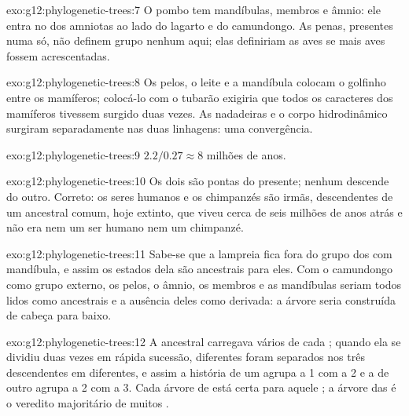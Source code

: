 \begin{solution}{exo:g12:phylogenetic-trees:7}
O pombo tem mandíbulas, membros e âmnio: ele entra no  dos
amniotas ao lado do lagarto e do camundongo. As penas, presentes numa
 só, não definem grupo nenhum aqui; elas definiriam as aves se
mais aves fossem acrescentadas.
\end{solution}

\begin{solution}{exo:g12:phylogenetic-trees:8}
Os pelos, o leite e a mandíbula colocam o golfinho entre os mamíferos;
colocá-lo com o tubarão exigiria que todos os caracteres dos mamíferos
tivessem surgido duas vezes. As nadadeiras e o corpo hidrodinâmico
surgiram separadamente nas duas linhagens: uma convergência.
\end{solution}

\begin{solution}{exo:g12:phylogenetic-trees:9}
$2.2/0.27 \approx 8$ milhões de anos.
\end{solution}

\begin{solution}{exo:g12:phylogenetic-trees:10}
Os dois são pontas do presente; nenhum descende do outro. Correto: os
seres humanos e os chimpanzés são  irmãs, descendentes de um
ancestral comum, hoje extinto, que viveu cerca de seis milhões de anos
atrás e não era nem um ser humano nem um chimpanzé.
\end{solution}

\begin{solution}{exo:g12:phylogenetic-trees:11}
Sabe-se que a lampreia fica fora do grupo dos  com
mandíbula, e assim os estados dela são ancestrais para eles. Com o
camundongo como grupo externo, os pelos, o âmnio, os membros e as
mandíbulas seriam todos lidos como ancestrais e a ausência deles como
derivada: a árvore seria construída de cabeça para baixo.
\end{solution}

\begin{solution}{exo:g12:phylogenetic-trees:12}
A  ancestral carregava vários  de cada ; quando ela
se dividiu duas vezes em rápida sucessão,  diferentes foram
separados nos três descendentes em  diferentes, e assim a história
de um  agrupa a  1 com a 2 e a de outro agrupa a 2 com a 3.
Cada árvore de  está certa para aquele ; a árvore das 
é o veredito majoritário de muitos .
\end{solution}

